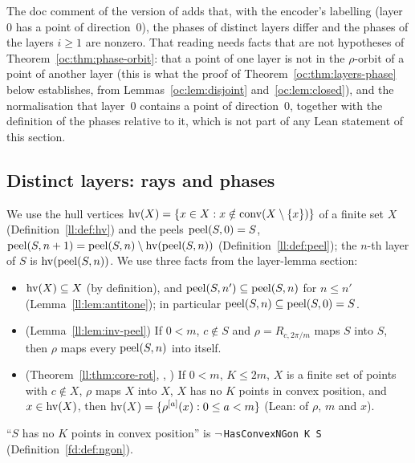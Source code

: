 \begin{remark}\label{oc:rem:phase-orbit}
The doc comment of the  version of  adds that,
with the encoder's labelling (layer~$0$ has a point of direction~$0$), the phases of distinct layers differ
and the phases of the layers $i\ge1$ are nonzero. That reading needs facts that are not hypotheses of
Theorem~\ref{oc:thm:phase-orbit}: that a point of one layer is not in the $\rho$-orbit of a point of
another layer (this is what the proof of Theorem~\ref{oc:thm:layers-phase} below establishes, from
Lemmas~\ref{oc:lem:disjoint} and~\ref{oc:lem:closed}), and the normalisation that layer~$0$ contains a
point of direction~$0$, together with the definition of the phases relative to it, which is not part of
any Lean statement of this section.
\end{remark}

\subsection{Distinct layers: rays and phases}\label{oc:sub:layers}

We use the hull vertices $\operatorname{hv}(X)=\{x\in X: x\notin\operatorname{conv}(X\setminus\{x\})\}$ of a finite set $X$
(Definition~\ref{ll:def:hv}) and the peels $\operatorname{peel}(S,0)=S$, $\operatorname{peel}(S,n+1)=\operatorname{peel}(S,n)\setminus\operatorname{hv}(\operatorname{peel}(S,n))$
(Definition~\ref{ll:def:peel}); the $n$-th layer of $S$ is $\operatorname{hv}(\operatorname{peel}(S,n))$. We use three facts from the layer-lemma
section:
\begin{itemize}
\item[(L1)] $\operatorname{hv}(X)\subseteq X$ (by definition), and $\operatorname{peel}(S,n')\subseteq\operatorname{peel}(S,n)$ for $n\le n'$
  (Lemma~\ref{ll:lem:antitone}); in particular $\operatorname{peel}(S,n)\subseteq\operatorname{peel}(S,0)=S$.
\item[(L2)] (Lemma~\ref{ll:lem:inv-peel}) If $0<m$, $c\notin S$ and $\rho=R_{c,2\pi/m}$ maps $S$ into
  $S$, then $\rho$ maps every $\operatorname{peel}(S,n)$ into itself.
\item[(L3)] (Theorem~\ref{ll:thm:core-rot}, ,
  ) If $0<m$, $K\le2m$, $X$ is a finite set of points with $c\notin X$,
  $\rho$ maps $X$ into $X$, $X$ has no $K$ points in convex position, and $x\in\operatorname{hv}(X)$, then
  $\operatorname{hv}(X)=\{\rho^{[a]}(x):0\le a<m\}$ (Lean:  of $\rho$, $m$ and $x$).
\end{itemize}
``$S$ has no $K$ points in convex position'' is $\neg\,$\texttt{HasConvexNGon K S} (Definition~\ref{fd:def:ngon}).

